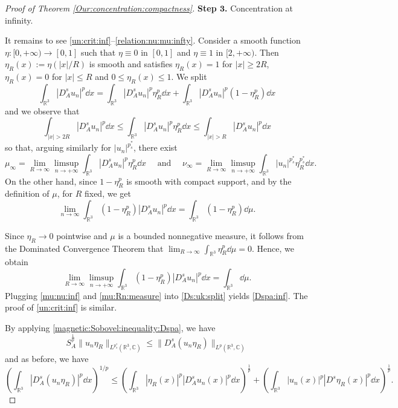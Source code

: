 \documentclass[leqno,11pt]{amsart}
\newcommand{\R}{\mathbb R}
\newcommand{\C}{\mathbb C}
\numberwithin{equation}{section}
\begin{document}
\begin{proof}[Proof of Theorem \ref{Our:concentration:compactness}]
{\bf Step $\mathbf{3}$.} Concentration at infinity.


It remains to see \eqref{un:crit:inf}--\eqref{relation:nu:mu:infty}. Consider a smooth function $\eta\colon [0,+\infty)\to [0,1]$ such that $\eta\equiv 0$ in $[0,1]$ and $\eta\equiv 1$ in $[2,+\infty)$. Then $\eta_R(x):=\eta(|x|/R)$ is smooth and satisfies $\eta_R(x)=1$ for $|x|\ge 2R$, $\eta_R(x)=0$ for $|x|\le R$ and $0\leq\eta_R(x)\leq1$. We split
\begin{equation}\label{Ds:uk:split}
    \int_{\R^3}|D^s_A u_n|^{p}\dd x = \int_{\R^3}|D^s_A u_n|^{p}\eta_R^p\dd x + \int_{\R^3}|D^s_A u_n|^{p}(1-\eta_R^p)\dd x
\end{equation}
and we observe that
$$ 
    \int_{|x|>2R}|D^s_A u_n|^{p}\dd x \leq \int_{\R^3} |D^s_A u_n|^{p}\eta_R^p\dd x \leq \int_{|x|>R} |D^s_A u_n|^p \dd x
$$
so that, arguing similarly for $|u_n|^{p^*_s}$, there exist
\begin{equation}\label{mu:nu:inf}
    \mu_\infty = \lim_{R\to\infty}\limsup_{n \to +\infty} \int_{\R^3} |D^s_A u_n|^p \eta_R^p\dd x \quad \text{ and } \quad 
    \nu_\infty = \lim_{R\to\infty}\limsup_{n \to +\infty} \int_{\R^3} |u_n|^{p^*_s} \eta_R^{p^*_s}\dd x.
\end{equation}
On the other hand, since $1-\eta_R^p$ is smooth with compact support, and by the definition of $\mu$, for $R$ fixed, we get
$$ 
    \lim_{n\to \infty}  \int_{\R^3} (1-\eta_R^p) |D^s_A u_n|^p\dd x = \int_{\R^3} (1-\eta_R^p)\dd\mu.  
$$

Since $\eta_R\to 0$ pointwise and $\mu$ is a bounded nonnegative measure, it follows from the Dominated Convergence Theorem that $\lim_{R\to \infty}\int_{\R^3} \eta_R^p\dd\mu = 0$. Hence, we obtain
\begin{equation}\label{mu:Rn:measure}
\lim_{R\to\infty}\limsup_{n \to +\infty} \int_{\R^3} (1-\eta_R^p) |D^s_A u_n|^p\dd x = \int_{\R^3} \dd \mu.
\end{equation}
Plugging \eqref{mu:nu:inf} and \eqref{mu:Rn:measure} into \eqref{Ds:uk:split} yields
\eqref{Dspa:inf}. The proof of \eqref{un:crit:inf} is similar.

By applying \eqref{magnetic:Sobovel:inequality:Dspa}, we have
$$
    S_A^\frac{1}{p}\|u_n \eta_R\|_{L^{p^*_s}(\R^3,\C)} \leq \| D^s_A(u_n \eta_R)\|_{L^p(\R^3,\C)}
$$ 
and as before, we have
$$
    \left(\int_{\R^3} |D^s_A(u_n \eta_R)|^p\dd x\right)^{1/p}\leq \left(\int_{\R^3} |\eta_R(x)|^p|D^s_A u_n(x)|^p\dd x\right)^{\frac{1}{p}}+\left(\int_{\R^3} |u_n(x)|^p |D^s \eta_R(x)|^{p}\dd x\right)^{\frac{1}{p}}.
$$


\end{proof}
\end{document}

